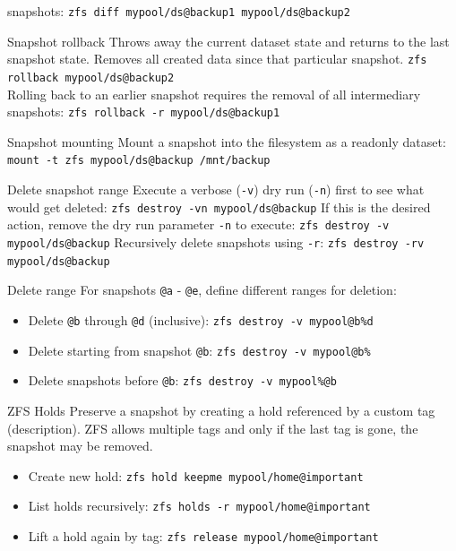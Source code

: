 \documentclass[10pt,landscape,letter]{article}
\begin{document}
\begin{multicols}{3}
\begin{Description}
          snapshots:
          \texttt{zfs diff mypool/ds@backup1 mypool/ds@backup2}
    \item[Snapshot rollback] Throws away the current dataset state and returns to
      the last snapshot state. Removes all created data since that particular snapshot.
      \texttt{zfs rollback mypool/ds@backup2}\\
      Rolling back to an earlier snapshot requires the removal of all intermediary snapshots:
      \texttt{zfs rollback -r mypool/ds@backup1}
    \item[Snapshot mounting] Mount a snapshot into the filesystem as a readonly dataset:
      \texttt{mount -t zfs mypool/ds@backup /mnt/backup}
    \item[Delete snapshot range] Execute a verbose (\texttt{-v}) dry run (\texttt{-n}) first to see
      what would get deleted:
      \texttt{zfs destroy -vn mypool/ds@backup}
      If this is the desired action, remove the dry run parameter \texttt{-n} to
      execute: \texttt{zfs destroy -v mypool/ds@backup} Recursively delete snapshots using \texttt{-r}: \texttt{zfs destroy -rv mypool/ds@backup}\\
    \item[Delete range] For snapshots \verb|@a| - \verb|@e|, define different ranges for deletion:
	\begin{itemize}
    \item Delete \verb|@b| through \verb|@d| (inclusive): \texttt{zfs destroy -v mypool@b\%d}
    \item Delete starting from snapshot \verb|@b|: \texttt{zfs destroy -v mypool@b\%}
    \item Delete snapshots before \verb|@b|: \texttt{zfs destroy -v mypool\%@b}
	\end{itemize}
\item[ZFS Holds] Preserve a snapshot by creating a hold referenced by a custom
  tag (description). ZFS allows multiple tags and only if the last tag is gone,
      the snapshot may be removed.
	\begin{itemize}
    \item Create new hold: \texttt{zfs hold keepme mypool/home@important}
    \item List holds recursively: \texttt{zfs holds -r mypool/home@important}
    \item Lift a hold again by tag: \texttt{zfs release mypool/home@important}
	\end{itemize}
	\end{Description}


\end{multicols}
\end{document}
